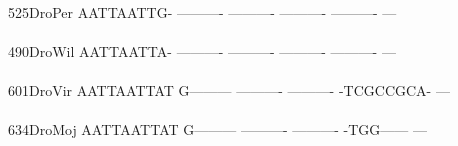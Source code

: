 \documentclass[11pt,twoside,reqno,a4paper]{article}
\begin{document}
{\hspace*{4\charwidth}\hspace*{7\charwidth}\hspace*{1\charwidth}\hspace*{1\charwidth}\hspace*{1\charwidth}\hspace*{1\charwidth}\hspace*{1\charwidth}\\
525\hspace*{1\charwidth}DroPer	AATTAATTG-	----------	----------	----------	----------	---\\
\hspace*{4\charwidth}\hspace*{7\charwidth}\hspace*{1\charwidth}\hspace*{1\charwidth}\hspace*{1\charwidth}\hspace*{1\charwidth}\hspace*{1\charwidth}\\
490\hspace*{1\charwidth}DroWil	AATTAATTA-	----------	----------	----------	----------	---\\
\hspace*{4\charwidth}\hspace*{7\charwidth}\hspace*{1\charwidth}\hspace*{1\charwidth}\hspace*{1\charwidth}\hspace*{1\charwidth}\hspace*{1\charwidth}\\
601\hspace*{1\charwidth}DroVir	AATTAATTAT	G---------	----------	----------	-TCGCCGCA-	---\\
\hspace*{4\charwidth}\hspace*{7\charwidth}\hspace*{1\charwidth}\hspace*{1\charwidth}\hspace*{1\charwidth}\hspace*{1\charwidth}\hspace*{1\charwidth}\\
634\hspace*{1\charwidth}DroMoj	AATTAATTAT	G---------	----------	----------	-TGG------	---\\
\hspace*{4\charwidth}\hspace*{7\charwidth}\hspace*{1\charwidth}\hspace*{1\charwidth}\hspace*{1\charwidth}\hspace*{1\charwidth}\hspace*{1\charwidth}\\
}
\end{document}
